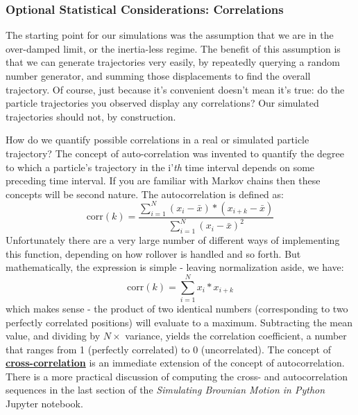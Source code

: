 \documentclass{../lab}
\begin{document}

\subsubsection{Optional Statistical Considerations: Correlations}

The starting point for our simulations was the assumption that we are in the over-damped limit, or the inertia-less regime. The benefit of this assumption is that we can generate trajectories very easily, by repeatedly querying a random number generator, and summing those displacements to find the overall trajectory. Of course, just because it's convenient doesn't mean it's true: do the particle trajectories you observed display any correlations? Our simulated trajectories should not, by construction.

How do we quantify possible correlations in a real or simulated particle trajectory? The concept of auto-correlation was invented to quantify the degree to which a particle's trajectory in the i'\emph{th} time interval depends on some preceding time interval. If you are familiar with Markov chains then these concepts will be second nature. The autocorrelation is defined as:
\begin{equation}
    \textrm{corr}(k) = \frac{\sum_{i=1}^N(x_i-\bar{x})*(x_{i+k}-\bar{x})}{\sum_{i=1}^N(x_i-\bar{x})^2}
\end{equation}
Unfortunately there are a very large number of different ways of implementing this function, depending on how rollover is handled and so forth. But mathematically, the expression is simple - leaving normalization aside, we have:
\begin{equation}
    \textrm{corr}(k) = \sum_{i=1}^N x_i*x_{i+k}
\end{equation}
which makes sense - the product of two identical numbers (corresponding to two perfectly correlated positions) will evaluate to a maximum. Subtracting the mean value, and dividing by $N \times$ variance, yields the correlation coefficient, a number that ranges from 1 (perfectly correlated) to 0 (uncorrelated). The concept of \href{https://drive.google.com/file/d/11dTpwbLwxOk2RSkeMMbuF_-GOCxmNsw0/view?usp=drive_link}{\textbf{cross-correlation}} is an immediate extension of the concept of autocorrelation. There is a more practical discussion of computing the cross- and autocorrelation sequences in the last section of the \emph{Simulating Brownian Motion in Python} Jupyter notebook.
\end{document}
